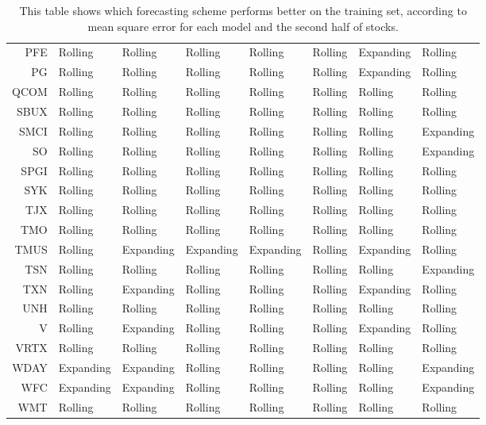 \begin{table}[ht]
\begin{tabular}{rlllllll}
  PFE & Rolling & Rolling & Rolling & Rolling & Rolling & Expanding & Rolling \\ 
  PG & Rolling & Rolling & Rolling & Rolling & Rolling & Expanding & Rolling \\ 
  QCOM & Rolling & Rolling & Rolling & Rolling & Rolling & Rolling & Rolling \\ 
  SBUX & Rolling & Rolling & Rolling & Rolling & Rolling & Rolling & Rolling \\ 
  SMCI & Rolling & Rolling & Rolling & Rolling & Rolling & Rolling & Expanding \\ 
  SO & Rolling & Rolling & Rolling & Rolling & Rolling & Rolling & Expanding \\ 
  SPGI & Rolling & Rolling & Rolling & Rolling & Rolling & Rolling & Rolling \\ 
  SYK & Rolling & Rolling & Rolling & Rolling & Rolling & Rolling & Rolling \\ 
  TJX & Rolling & Rolling & Rolling & Rolling & Rolling & Rolling & Rolling \\ 
  TMO & Rolling & Rolling & Rolling & Rolling & Rolling & Rolling & Rolling \\ 
  TMUS & Rolling & Expanding & Expanding & Expanding & Rolling & Expanding & Rolling \\ 
  TSN & Rolling & Rolling & Rolling & Rolling & Rolling & Rolling & Expanding \\ 
  TXN & Rolling & Expanding & Rolling & Rolling & Rolling & Expanding & Rolling \\ 
  UNH & Rolling & Rolling & Rolling & Rolling & Rolling & Rolling & Rolling \\ 
  V & Rolling & Expanding & Rolling & Rolling & Rolling & Expanding & Rolling \\ 
  VRTX & Rolling & Rolling & Rolling & Rolling & Rolling & Rolling & Rolling \\ 
  WDAY & Expanding & Expanding & Rolling & Rolling & Rolling & Rolling & Expanding \\ 
  WFC & Expanding & Expanding & Rolling & Rolling & Rolling & Rolling & Expanding \\ 
  WMT & Rolling & Rolling & Rolling & Rolling & Rolling & Rolling & Rolling \\ 
   \hline
\end{tabular}
\caption[Better scheme MSE (2)]{This table shows which forecasting scheme performs better on the training set, according to mean square error
              for each model and the second half of stocks.} 
\label{Table:Better_MSE_2}
\end{table}

